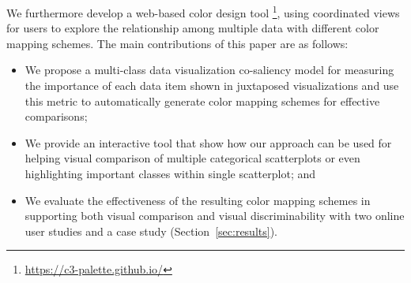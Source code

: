 We furthermore develop a web-based color design tool \footnote{\small \url{https://c3-palette.github.io/}}, using coordinated views for users to explore the relationship among multiple data with different color mapping schemes. %
The main contributions of this paper are as follows:
\begin{itemize}[noitemsep]
\setlength{\itemsep}{5pt}
  \item We propose a multi-class data visualization co-saliency model for measuring the importance of each data item shown in juxtaposed visualizations and use this metric to automatically generate color mapping schemes for effective comparisons;
    \item
  We provide an interactive tool that show how our approach can be used for helping visual comparison of multiple categorical scatterplots or even highlighting important classes within single scatterplot; and
  \item
   We evaluate the effectiveness of the resulting color mapping schemes in supporting both visual comparison and visual discriminability with two online user studies and a case study (Section~\ref{sec:results}).

\end{itemize}

